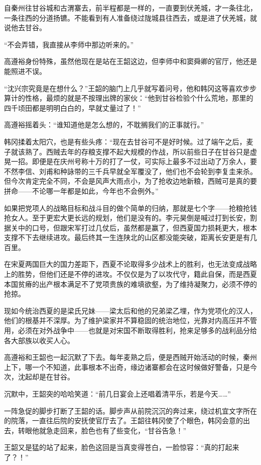 自秦州往甘谷城和古渭寨去，前半程都是一样的，一直要到伏羌城，才一条往北，一条往西的分道扬镳。不能看到有人准备绕过陇城县往西去，或是进了伏羌城，就说他去甘谷。

“不会弄错，我直接从李师中那边听来的。”

高遵裕身份特殊，虽然他现在是站在王韶这边，但李师中和窦舜卿的官厅，他还是能照进不误。

“沈兴宗究竟是在想什么？”王韶的脑门上几乎就写着问号，他和韩冈这等喜欢步步算计的性格，最烦的就是不按理出牌的家伙：“他到甘谷检验个什么荒地，那里的四千顷田都是明明白白的，早就丈量过了！”

高遵裕摇着头：“谁知道他是怎么想的，不耽搁我们的正事就行。”

韩冈揉着太阳穴，也是有些头疼：“现在去甘谷可不是好时候。过了端午之后，麦子就该熟了。西贼去年的存粮支撑不起大规模的作战，所以前些日子在甘谷只是虚晃一招。即便是在庆州号称十万的打了一仗，可实际上最多不过出动了万余人，要不然李信、刘甫和种詠带的三千兵早就全军覆没了，他们也不会轮到李复圭来杀。但今次肯定完全不同，不会是风声大雨点小，为了抢收边地新粮，西贼可是真的要拼命——不论哪一年都是如此，今年也不会例外。”

如果把党项人的战略目标和战斗目的做个简单的归纳，那就是七个字——抢粮抢钱抢女人。至于更宏大更长远的规划，他们是没有的。李元昊倒是喊过打到长安，割据关中的口号，但跟宋军打过几仗后，虽然都是赢了，但西夏国力损耗更大，根本支撑不下去继续进攻。最后终其一生连陕北的山区都没能突破，距离长安更是有几百里。

在宋夏两国巨大的国力差距下，西夏不论取得多少战术上的胜利，也无法变成战略上的胜势，但他们还是不停的进攻。不仅仅是为了以攻代守，籍此自保，而是西夏本国贫瘠的出产根本满足不了党项贵族的难填欲壑，为了维持凝聚力，必须不停的抢掠。

现如今统治西夏的是梁氏兄妹——梁太后和他的兄弟梁乙埋，作为党项化的汉人，他们的根基并不深厚。为了维护梁家并不算稳固的统治地位，光靠对内高压并不管用，必须在对外战争中——也就是对宋国不断取得胜利，抢来足够多的战利品分给各大部族以收买人心。

高遵裕和王韶也一起沉默了下去。每年麦熟之后，便是西贼开始活动的时候，秦州上下，哪一个不知道，此事根本不出奇，缘边诸寨都会在这时候做好警备，只是今次，沈起却是在甘谷。

沉默中，王韶突的哈哈笑道：“前几日宴会上还唱着清平乐，若是今天……”

一阵急促的脚步打断了王韶的话。脚步声从前院沉沉的奔过来，绕过机宜文字所在的院落，一直往后院的安抚使官厅去了。王韶往韩冈使了个眼色，韩冈会意的出去，转眼他就急走回来，脸色也有了些变化，“甘谷告急！”

王韶又是猛的站了起来，脸色这回是当真变得苍白，一脸惊容：“真的打起来了？！”

